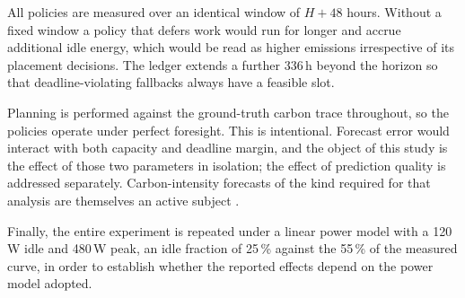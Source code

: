 All policies are measured over an identical window of $H + 48$ hours. Without a
fixed window a policy that defers work would run for longer and accrue
additional idle energy, which would be read as higher emissions irrespective of
its placement decisions. The ledger extends a further 336\,h beyond the horizon
so that deadline-violating fallbacks always have a feasible slot.

Planning is performed against the ground-truth carbon trace throughout, so the
policies operate under perfect foresight. This is intentional. Forecast error
would interact with both capacity and deadline margin, and the object of this
study is the effect of those two parameters in isolation; the effect of
prediction quality is addressed separately. Carbon-intensity forecasts of the
kind required for that analysis are themselves an active subject
\cite{maji2022carboncast,maji2022dacf}.

Finally, the entire experiment is repeated under a linear power model with a
120\,W idle and 480\,W peak, an idle fraction of 25\,\% against the 55\,\% of
the measured curve, in order to establish whether the reported effects depend
on the power model adopted.
